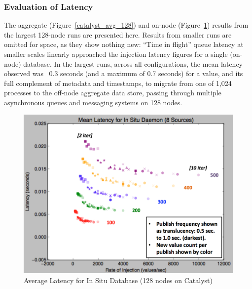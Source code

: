 \subsubsection{Evaluation of Latency} %
%
The aggregate (Figure~\ref{catalyst_avg_128}) and on-node
(Figure~\ref{catalyst_avg_node}) results from the largest 128-node
runs are presented here.
%
Results from smaller runs are omitted for space, as they show nothing
new: ``Time in flight'' queue latency at smaller scales linearly
approached the injection latency figures for a single (on-node)
database.
%
In the largest runs, across all configurations, the mean latency
observed was ~0.3 seconds (and a maximum of 0.7 seconds) for a value,
and its full complement of metadata and timestamps, to migrate from
one of 1,024 processes to the off-node aggregate data store, passing
through multiple asynchronous queues and messaging systems on 128
nodes.
%

\begin{figure}[h]
\centering
\includegraphics[width=\columnwidth]{images/avg_node.png}
\caption{Average Latency for In Situ Database (128 nodes on Catalyst)}
\label{catalyst_avg_node}
\end{figure}


